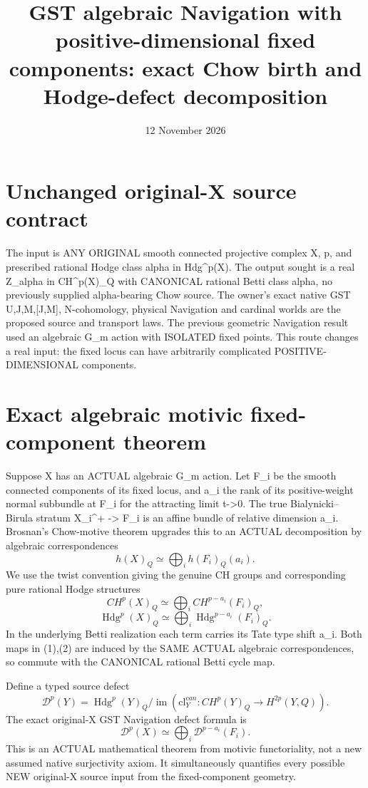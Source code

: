 \documentclass[11pt]{article}
\title{GST algebraic Navigation with positive-dimensional fixed components: exact Chow birth and Hodge-defect decomposition}
\date{12 November 2026}
\begin{document}
\maketitle

\section{Unchanged original-X source contract}
The input is ANY ORIGINAL smooth connected projective complex X,
p, and prescribed rational Hodge class alpha in Hdg^p(X).
The output sought is a real Z_alpha in CH^p(X)_Q with
CANONICAL rational Betti class alpha, no previously supplied
alpha-bearing Chow source. The owner's exact native GST
U,J,M,[J,M], N-cohomology, physical Navigation and
cardinal worlds are the proposed source and transport laws.
The previous geometric Navigation result used an algebraic
G_m action with ISOLATED fixed points.
This route changes a real input: the fixed locus can have
arbitrarily complicated POSITIVE-DIMENSIONAL components.

\section{Exact algebraic motivic fixed-component theorem}
Suppose X has an ACTUAL algebraic G_m action. Let F_i be
the smooth connected components of its fixed locus,
and a_i the rank of its positive-weight normal subbundle
at F_i for the attracting limit t->0. The true Bialynicki--Birula
stratum X_i^+ -> F_i is an affine bundle of relative
dimension a_i. Brosnan's Chow-motive theorem upgrades this
to an ACTUAL decomposition by algebraic correspondences
\[
h(X)_Q\simeq\bigoplus_i h(F_i)_Q(a_i).
\]
We use the twist convention giving the genuine CH groups
and corresponding pure rational Hodge structures
\[
\boxed{CH^p(X)_Q\simeq\bigoplus_i CH^{p-a_i}(F_i)_Q,}
\tag{1}
\]
\[
\boxed{\operatorname{Hdg}^p(X)_Q\simeq
\bigoplus_i\operatorname{Hdg}^{p-a_i}(F_i)_Q.}
\tag{2}
\]
In the underlying Betti realization each term carries its
Tate type shift a_i. Both maps in (1),(2) are induced by
the SAME ACTUAL algebraic correspondences, so commute
with the CANONICAL rational Betti cycle map.

Define a typed source defect
\[
\mathcal D^p(Y)=\operatorname{Hdg}^p(Y)_Q/
\operatorname{im}(\mathrm{cl}^{can}_Y:CH^p(Y)_Q\to
H^{2p}(Y,Q)).
\]
The exact original-X GST Navigation defect formula is
\[
\boxed{\mathcal D^p(X)\simeq
\bigoplus_i\mathcal D^{p-a_i}(F_i).}
\tag{3}
\]
This is an ACTUAL mathematical theorem from motivic functoriality,
not a new assumed native surjectivity axiom.
It simultaneously quantifies every possible NEW
original-X source input from the fixed-component geometry.
\end{document}
